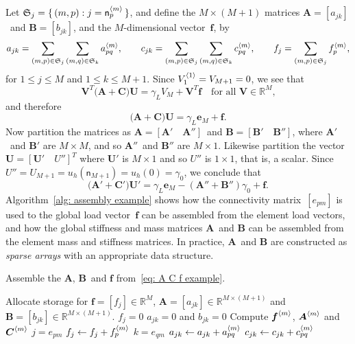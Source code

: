 Let $\mathfrak{S}_j=\{\,(m,p):j=\mathsf{n}^{\langle m\rangle}_p\,\}$, and
define the $M\times(M+1)$ matrices $\boldsymbol{A}=[a_{jk}]$~and 
$\boldsymbol{B}=[b_{jk}]$, and the $M$-dimensional vector~$\boldsymbol{f}$, by
\[
a_{jk}=\sum_{(m,p)\in\mathfrak{S}_j}
    \sum_{(m,q)\in\mathfrak{S}_k}a^{\langle m\rangle}_{pq},\qquad
c_{jk}=\sum_{(m,p)\in\mathfrak{S}_j}
    \sum_{(m,q)\in\mathfrak{S}_k}c^{\langle m\rangle}_{pq},\qquad
f_j=\sum_{(m,p)\in\mathfrak{S}_j}f^{\langle m\rangle}_p,
\]
for $1\le j\le M$ and $1\le k\le M+1$.  Since $V^{\langle1\rangle}_1=V_{M+1}=0$, we see
that
\[
\boldsymbol{V}^T\bigl(\boldsymbol{A}+\boldsymbol{C}\bigr)\boldsymbol{U}
    =\gamma_LV_M+\boldsymbol{V}^T\boldsymbol{f}
    \quad\text{for all $\boldsymbol{V}\in\mathbb{R}^M$,}
\]
and therefore
\begin{equation}\label{eq: A C f example}
\bigl(\boldsymbol{A}+\boldsymbol{C}\bigr)\boldsymbol{U}
    =\gamma_L\boldsymbol{e}_M+\boldsymbol{f}.
\end{equation}
Now partition the matrices as 
$\boldsymbol{A}=[\boldsymbol{A}'\quad\boldsymbol{A}'']$~and
$\boldsymbol{B}=[\boldsymbol{B}'\quad\boldsymbol{B}'']$, where 
$\boldsymbol{A}'$~and $\boldsymbol{B}'$ are $M\times M$, and so
$\boldsymbol{A}''$~and $\boldsymbol{B}''$ are $M\times1$.  Likewise partition 
the vector~$\boldsymbol{U}=[\boldsymbol{U}'\quad U'']^T$ where 
$\boldsymbol{U}'$ is $M\times1$ and so $U''$ is $1\times1$, that is, a scalar.  
Since $U''=U_{M+1}=u_h(\mathsf{n}_{M+1})=u_h(0)=\gamma_0$, we conclude that
\[
\bigl(\boldsymbol{A}'+\boldsymbol{C}'\bigr)\boldsymbol{U}'
=\gamma_L\boldsymbol{e}_M-(\boldsymbol{A}''+\boldsymbol{B}'')\gamma_0
    +\boldsymbol{f}.
\]
Algorithm~\ref{alg: assembly example} shows how the connectivity 
matrix~$[e_{pm}]$ is used to the global load 
vector~$\boldsymbol{f}$ can be assembled from the element load vectors, and 
how the global stiffness and mass matrices $\boldsymbol{A}$~and $\boldsymbol{B}$ 
can be assembled from the element mass and stiffness matrices.  In practice,
$\boldsymbol{A}$~and $\boldsymbol{B}$ are constructed as \emph{sparse arrays}
with an appropriate data structure.

\begin{algorithm}
\caption{Assemble the $\boldsymbol{A}$, $\boldsymbol{B}$~and $\boldsymbol{f}$
from~\eqref{eq: A C f example}.}
\label{alg: assembly example}
\begin{algorithmic}
\State Allocate storage for $\boldsymbol{f}=[f_j]\in\mathbb{R}^M$,
$\boldsymbol{A}=[a_{jk}]\in\mathbb{R}^{M\times(M+1)}$ and
$\boldsymbol{B}=[b_{jk}]\in\mathbb{R}^{M\times(M+1)}$.
    \State $f_j=0$
        \State $a_{jk}=0$ and $b_{jk}=0$
    \EndFor
\EndFor
{}
    \State Compute $\boldsymbol{f}^{\langle m\rangle}$, $\boldsymbol{A}^{\langle m\rangle}$ and
           $\boldsymbol{C}^{\langle m\rangle}$
        \State $j=e_{pm}$
            \State $f_j\gets f_j+f^{\langle m\rangle}_p$
        \EndIf
            \State $k=e_{qm}$
            \State $a_{jk}\gets a_{jk}+a^{\langle m\rangle}_{pq}$
            \State $c_{jk}\gets c_{jk}+c^{\langle m\rangle}_{pq}$
        \EndFor
    \EndFor
\EndFor
\end{algorithmic}
\end{algorithm}

